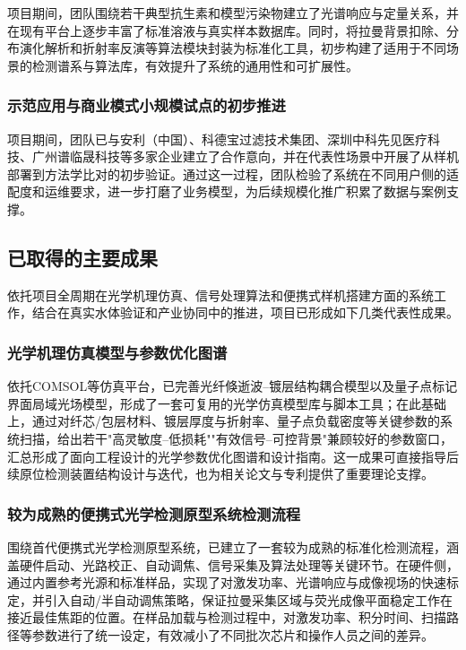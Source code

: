 \documentclass[12pt,a4paper]{article}
\begin{document}
项目期间，团队围绕若干典型抗生素和模型污染物建立了光谱响应与定量关系，并在现有平台上逐步丰富了标准溶液与真实样本数据库。同时，将拉曼背景扣除、分布演化解析和折射率反演等算法模块封装为标准化工具，初步构建了适用于不同场景的检测谱系与算法库，有效提升了系统的通用性和可扩展性。

\subsubsection{示范应用与商业模式小规模试点的初步推进}

项目期间，团队已与安利（中国）、科德宝过滤技术集团、深圳中科先见医疗科技、广州谱临晟科技等多家企业建立了合作意向，并在代表性场景中开展了从样机部署到方法学比对的初步验证。通过这一过程，团队检验了系统在不同用户侧的适配度和运维要求，进一步打磨了业务模型，为后续规模化推广积累了数据与案例支撑。

\subsection{已取得的主要成果}

依托项目全周期在光学机理仿真、信号处理算法和便携式样机搭建方面的系统工作，结合在真实水体验证和产业协同中的推进，项目已形成如下几类代表性成果。

\subsubsection{光学机理仿真模型与参数优化图谱}

依托COMSOL等仿真平台，已完善光纤倏逝波--镀层结构耦合模型以及量子点标记界面局域光场模型，形成了一套可复用的光学仿真模型库与脚本工具；在此基础上，通过对纤芯/包层材料、镀层厚度与折射率、量子点负载密度等关键参数的系统扫描，给出若干"高灵敏度--低损耗""有效信号--可控背景"兼顾较好的参数窗口，汇总形成了面向工程设计的光学参数优化图谱和设计指南。这一成果可直接指导后续原位检测装置结构设计与迭代，也为相关论文与专利提供了重要理论支撑。

\subsubsection{较为成熟的便携式光学检测原型系统检测流程}

围绕首代便携式光学检测原型系统，已建立了一套较为成熟的标准化检测流程，涵盖硬件启动、光路校正、自动调焦、信号采集及算法处理等关键环节。在硬件侧，通过内置参考光源和标准样品，实现了对激发功率、光谱响应与成像视场的快速标定，并引入自动/半自动调焦策略，保证拉曼采集区域与荧光成像平面稳定工作在接近最佳焦距的位置。在样品加载与检测过程中，对激发功率、积分时间、扫描路径等参数进行了统一设定，有效减小了不同批次芯片和操作人员之间的差异。
\end{document}

